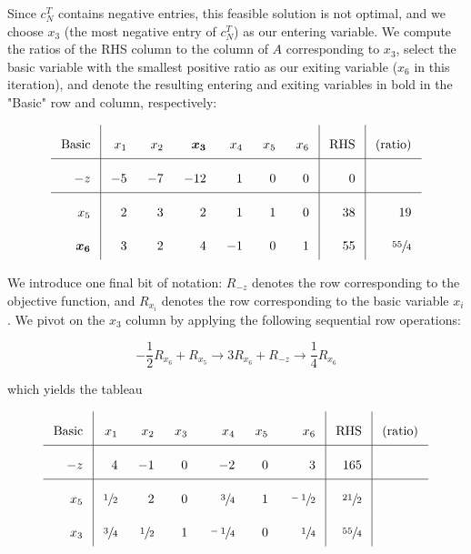 \begin{solution}
  Since $c_N^T$ contains negative entries, this feasible solution is not optimal, and we choose $x_3$ (the most negative
  entry of $c_N^T$) as our entering variable. We compute the ratios of the RHS column to the column of $A$ corresponding
  to $x_3$, select the basic variable with the smallest positive ratio as our exiting variable ($x_6$ in this 
  iteration), and denote the resulting entering and exiting variables in bold in the "Basic" row and column, 
  respectively:
  
  \[\arraycolsep=8pt\def\arraystretch{2.2}
  \begin{array}{r|rrrrrr|r|r}
    \text{Basic} &  x_1  &  x_2  &  \bm{x_3}  &  x_4  & x_5 & x_6  & \text{RHS} & \text{(ratio)}  \\ \hline
    -z           &  -5   &  -7   &  -12       &   1   &  0  &  0   &   0        &                 \\ \hline
    x_5          &   2   &   3   &   2        &   1   &  1  &  0   &  38        & 19              \\
    \bm{x_6}     &   3   &   2   &   4        &  -1   &  0  &  1   &  55        & \sfrac{55}{4}              
  \end{array}
  \]

  We introduce one final bit of notation: $R_{-z}$ denotes the row corresponding to the objective function, and $R_{x_i}$
  denotes the row corresponding to the basic variable $x_i$. We pivot on the $x_3$ column by applying the following 
  sequential row operations:
  
  $$
  -\frac{1}{2} R_{x_6} + R_{x_5}  \longrightarrow 3 R_{x_6} + R_{-z} \longrightarrow \frac{1}{4} R_{x_6}
  $$

  which yields the tableau
  
  \[\arraycolsep=8pt\def\arraystretch{2.2}
  \begin{array}{r|rrrrrr|r|r}
    \text{Basic} &  x_1            &  x_2            &  x_3  &  x_4            &  x_5  &  x_6            &  \text{RHS}     & \text{(ratio)}  \\ \hline
    -z           &   4             &  -1             &  0    &  -2             &   0   &  3              &  165           &                 \\ \hline
    x_5          &   \sfrac{1}{2}  &   2             &  0    &  \sfrac{3}{4}   &   1   &  \sfrac{-1}{2}  &  \sfrac{21}{2} &                 \\
    x_3          &   \sfrac{3}{4}  &   \sfrac{1}{2}  &  1    &  \sfrac{-1}{4}  &   0   &  \sfrac{1}{4}   &  \sfrac{55}{4} &                            
  \end{array}
  \]


\end{solution}
